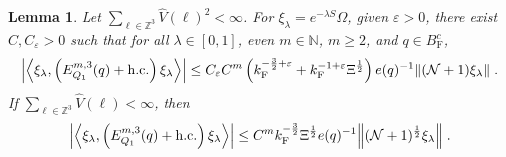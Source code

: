 \documentclass[12pt,a4paper]{article}
\numberwithin{equation}{section}
\newcommand{\NNN}{\mathbb{N}}
\newcommand{\1}{\mathbb{I}}
\newcommand{\F}{\mathrm{F}}
\newcommand{\kF}{k_\F}
\newcommand{\Zstar}{\mathbb{Z}^3} %
\newcommand{\Z}{\mathbb{Z}}
\newcommand{\NN}{\mathcal{N}}
\newcommand{\half}{\frac{1}{2}}
\newcommand{\eva}[1]{\left\langle #1 \right\rangle}
\theoremstyle{plain}
\newtheorem{lemma}[theorem]{Lemma}
\theoremstyle{definition}
\theoremstyle{remark}
\theoremstyle{plain}
\theoremstyle{definition}
\theoremstyle{remark}
\begin{document}
\begin{lemma} \label{lem:EQ112}
Let $ \sum_{\ell \in \Zstar} \hat{V}(\ell)^2 < \infty $. For $\xi_\lambda = e^{-\lambda S} \Omega$, given $ \varepsilon > 0 $, there exist $ C, C_\varepsilon > 0 $ such that for all $ \lambda \in [0,1] $, even $ m \in \NNN $, $ m \ge 2 $, and $ q \in B_{\F}^c $,
\begin{align} \label{eq:estEQ112_Coulomb}
	\abs{\eva{\xi_\lambda,\left(E^{m,3}_{Q_1}(q) + \mathrm{h.c.}\right) \xi_\lambda }}
	\leq C_\varepsilon C^m \left( \kF^{-\frac 32 + \varepsilon}
		+ \kF^{-1 + \varepsilon} \Xi^\half \right)
		e(q)^{-1}
		\norm{(\NN+1) \xi_\lambda } \;.
\end{align}
If $ \sum_{\ell \in \Zstar} \hat{V}(\ell) < \infty $, then
\begin{align} \label{eq:estEQ112}
	\abs{\eva{\xi_\lambda,\left(E^{m,3}_{Q_1}(q) + \mathrm{h.c.}\right) \xi_\lambda }}
	\leq C^m \kF^{-\frac{3}{2}} \Xi^{\half} e(q)^{-1}
		\norm{(\NN+1)^\half \xi_\lambda } \;.
\end{align}
\end{lemma}
\end{document}
